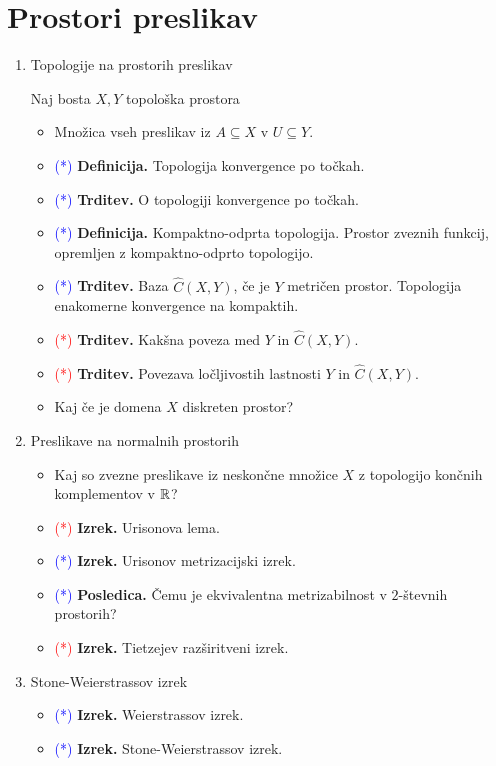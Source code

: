 \section{Prostori preslikav}

\begin{enumerate}
    \item Topologije na prostorih preslikav
    
    Naj bosta \(X, Y\) topološka prostora
    \begin{itemize}
        \item Množica vseh preslikav iz \(A \subseteq X\) v \(U \subseteq Y\).
        \item \textcolor{blue}{(*)} \textbf{Definicija.} Topologija konvergence po točkah.
        \item \textcolor{blue}{(*)} \textbf{Trditev.} O topologiji konvergence po točkah.
        \item \textcolor{blue}{(*)} \textbf{Definicija.} Kompaktno-odprta topologija. Prostor zveznih funkcij, opremljen z kompaktno-odprto topologijo.
        \item \textcolor{blue}{(*)} \textbf{Trditev.} Baza \(\widehat{C}(X, Y)\), če je \(Y\) metričen prostor. Topologija enakomerne konvergence na kompaktih.
        \item \textcolor{red}{(*)} \textbf{Trditev.} Kakšna poveza med \(Y\) in \(\widehat{C}(X, Y)\).
        \item \textcolor{red}{(*)} \textbf{Trditev.} Povezava ločljivostih lastnosti \(Y\) in \(\widehat{C}(X, Y)\).
        \item Kaj če je domena \(X\) diskreten prostor?
    \end{itemize}

    \item Preslikave na normalnih prostorih
    \begin{itemize}
        \item Kaj so zvezne preslikave iz neskončne množice \(X\) z topologijo končnih komplementov v \(\mathbb{R}\)?
        \item \textcolor{red}{(*)} \textbf{Izrek.} Urisonova lema.
        \item \textcolor{blue}{(*)} \textbf{Izrek.} Urisonov metrizacijski izrek.
        \item \textcolor{blue}{(*)} \textbf{Posledica.} Čemu je ekvivalentna metrizabilnost v \(2\)-števnih prostorih?
        \item \textcolor{red}{(*)} \textbf{Izrek.} Tietzejev razširitveni izrek.
    \end{itemize}

    \item Stone-Weierstrassov izrek
    \begin{itemize}
        \item \textcolor{blue}{(*)} \textbf{Izrek.} Weierstrassov izrek.
        \item \textcolor{blue}{(*)} \textbf{Izrek.} Stone-Weierstrassov izrek.
    \end{itemize}
\end{enumerate}